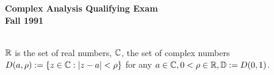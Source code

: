 \documentclass{article}
\begin{document}






\begin{center}\begin{LARGE}
{\bf Complex Analysis Qualifying Exam}\\ 
{\bf Fall 1991}\\ \end{LARGE}
\end{center}
\vspace{0.1in}
\noindent\hrulefill\\
$\Bbb R$ is the set of real numbers, $\Bbb C$, the set of complex numbers
$D(a, \rho) := \{ z \in \Bbb C : |z-a| < \rho\}$ for any
$a \in \Bbb C, 0 < \rho \in \Bbb R, \Bbb D := D(0,1)$.
\end{document}
